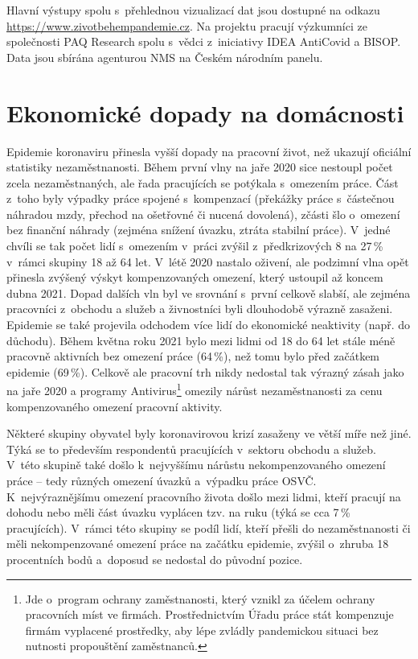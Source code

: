 Hlavní výstupy spolu s přehlednou vizualizací dat jsou dostupné na odkazu \url{https://www.zivotbehempandemie.cz}. Na projektu pracují výzkumníci ze společnosti PAQ Research spolu s vědci z iniciativy IDEA AntiCovid a BISOP. Data jsou sbírána agenturou NMS na Českém národním panelu.

\section*{Ekonomické dopady na domácnosti}
\label{Ekonomicke_dopady}

Epidemie koronaviru přinesla vyšší dopady na pracovní život, než ukazují oficiální statistiky nezaměstnanosti. Během první vlny na jaře 2020 sice nestoupl počet zcela nezaměstnaných, ale řada pracujících se potýkala s~omezením práce. Část z~toho byly výpadky práce spojené s kompenzací (překážky práce s~částečnou náhradou mzdy, přechod na ošetřovné či nucená dovolená), zčásti šlo o~omezení bez finanční náhrady (zejména snížení úvazku, ztráta stabilní práce). V~jedné chvíli se tak počet lidí s~omezením v~práci zvýšil z~předkrizových 8 na 27\,\% v rámci skupiny 18 až 64 let. V~létě 2020 nastalo oživení, ale podzimní vlna opět přinesla zvýšený výskyt kompenzovaných omezení, který ustoupil až koncem dubna 2021. Dopad dalších vln byl ve srovnání s~první celkově slabší, ale zejména pracovníci z~obchodu a služeb a živnostníci byli dlouhodobě výrazně zasaženi. Epidemie se také projevila odchodem více lidí do ekonomické neaktivity (např. do důchodu). Během května roku 2021 bylo mezi lidmi od 18 do 64 let stále méně pracovně aktivních bez omezení práce (64\,\%), než tomu bylo před začátkem epidemie (69\,\%). Celkově ale pracovní trh nikdy nedostal tak výrazný zásah jako na jaře 2020 a programy Antivirus\footnote{Jde o~program ochrany zaměstnanosti, který vznikl za účelem ochrany pracovních míst ve firmách. Prostřednictvím Úřadu práce stát kompenzuje firmám vyplacené prostředky, aby lépe zvládly pandemickou situaci bez nutnosti propouštění zaměstnanců.} omezily nárůst nezaměstnanosti za cenu kompenzovaného omezení pracovní aktivity.

Některé skupiny obyvatel byly koronavirovou krizí zasaženy ve větší míře než jiné. Týká se to především respondentů pracujících v sektoru obchodu a služeb. V této skupině také došlo k nejvyššímu nárůstu nekompenzovaného omezení práce – tedy různých omezení úvazků a výpadku práce OSVČ. K nejvýraznějšímu omezení pracovního života došlo mezi lidmi, kteří pracují na dohodu nebo měli část úvazku vyplácen tzv. na ruku (týká se cca 7\,\% pracujících). V rámci této skupiny se podíl lidí, kteří přešli do nezaměstnanosti či měli nekompenzované omezení práce na začátku epidemie, zvýšil o~zhruba 18 procentních bodů a doposud se nedostal do původní pozice.


